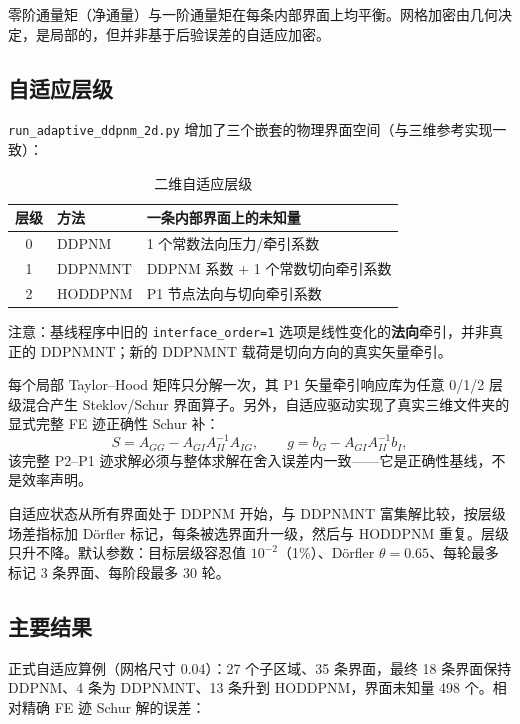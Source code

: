 \documentclass[11pt,a4paper]{ctexart}
\newcommand{\Dd}{DDPNM}
\begin{document}
零阶通量矩（净通量）与一阶通量矩在每条内部界面上均平衡。网格加密由几何决定，是局部的，但并非基于后验误差的自适应加密。

\subsection{自适应层级}
\label{sec:2d-adaptive}

\texttt{run\_adaptive\_ddpnm\_2d.py} 增加了三个嵌套的物理界面空间（与三维参考实现一致）：

\begin{table}[h]
\centering
\caption{二维自适应层级}
\begin{tabular}{cll}
\toprule
层级 & 方法 & 一条内部界面上的未知量 \\
\midrule
0 & \Dd{} & 1 个常数法向压力/牵引系数 \\
1 & \Dd{}NT & \Dd{} 系数 + 1 个常数切向牵引系数 \\
2 & HODDPNM & P1 节点法向与切向牵引系数 \\
\bottomrule
\end{tabular}
\end{table}

注意：基线程序中旧的 \texttt{interface\_order=1} 选项是线性变化的\textbf{法向}牵引，并非真正的 \Dd{}NT；新的 \Dd{}NT 载荷是切向方向的真实矢量牵引。

每个局部 Taylor--Hood 矩阵只分解一次，其 P1 矢量牵引响应库为任意 0/1/2 层级混合产生 Steklov/Schur 界面算子。另外，自适应驱动实现了真实三维文件夹的显式完整 FE 迹正确性 Schur 补：
\begin{equation}
  S=A_{GG}-A_{GI}A_{II}^{-1}A_{IG},\qquad
  g=b_G-A_{GI}A_{II}^{-1}b_I,
\end{equation}
该完整 P2--P1 迹求解必须与整体求解在舍入误差内一致——它是正确性基线，不是效率声明。

自适应状态从所有界面处于 \Dd{} 开始，与 \Dd{}NT 富集解比较，按层级场差指标加 D\"orfler 标记，每条被选界面升一级，然后与 HODDPNM 重复。层级只升不降。默认参数：目标层级容忍值 $10^{-2}$（1\%）、D\"orfler $\theta=0.65$、每轮最多标记 3 条界面、每阶段最多 30 轮。

\subsection{主要结果}
\label{sec:2d-results}

正式自适应算例（网格尺寸 0.04）：27 个子区域、35 条界面，最终 18 条界面保持 \Dd{}、4 条为 \Dd{}NT、13 条升到 HODDPNM，界面未知量 498 个。相对精确 FE 迹 Schur 解的误差：
\end{document}
